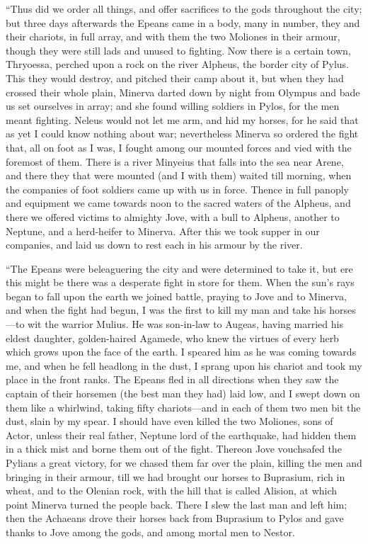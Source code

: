 “Thus did we order all things, and offer sacrifices to the gods throughout
the city; but three days afterwards the Epeans came in a body, many in
number, they and their chariots, in full array, and with them the two
Moliones in their armour, though they were still lads and unused to
fighting. Now there is a certain town, Thryoessa, perched upon a rock on
the river Alpheus, the border city of Pylus. This they would destroy, and
pitched their camp about it, but when they had crossed their whole plain,
Minerva darted down by night from Olympus and bade us set ourselves in
array; and she found willing soldiers in Pylos, for the men meant
fighting. Neleus would not let me arm, and hid my horses, for he said that
as yet I could know nothing about war; nevertheless Minerva so ordered the
fight that, all on foot as I was, I fought among our mounted forces and
vied with the foremost of them. There is a river Minyeius that falls into
the sea near Arene, and there they that were mounted (and I with them)
waited till morning, when the companies of foot soldiers came up with us
in force. Thence in full panoply and equipment we came towards noon to the
sacred waters of the Alpheus, and there we offered victims to almighty
Jove, with a bull to Alpheus, another to Neptune, and a herd-heifer to
Minerva. After this we took supper in our companies, and laid us down to
rest each in his armour by the river.

“The Epeans were beleaguering the city and were determined to take it, but
ere this might be there was a desperate fight in store for them. When the
sun’s rays began to fall upon the earth we joined battle, praying to Jove
and to Minerva, and when the fight had begun, I was the first to kill my
man and take his horses—to wit the warrior Mulius. He was son-in-law
to Augeas, having married his eldest daughter, golden-haired Agamede, who
knew the virtues of every herb which grows upon the face of the earth. I
speared him as he was coming towards me, and when he fell headlong in the
dust, I sprang upon his chariot and took my place in the front ranks. The
Epeans fled in all directions when they saw the captain of their horsemen
(the best man they had) laid low, and I swept down on them like a
whirlwind, taking fifty chariots—and in each of them two men bit the
dust, slain by my spear. I should have even killed the two Moliones, sons
of Actor, unless their real father, Neptune lord of the earthquake, had
hidden them in a thick mist and borne them out of the fight. Thereon Jove
vouchsafed the Pylians a great victory, for we chased them far over the
plain, killing the men and bringing in their armour, till we had brought
our horses to Buprasium, rich in wheat, and to the Olenian rock, with the
hill that is called Alision, at which point Minerva turned the people
back. There I slew the last man and left him; then the Achaeans drove
their horses back from Buprasium to Pylos and gave thanks to Jove among
the gods, and among mortal men to Nestor.

